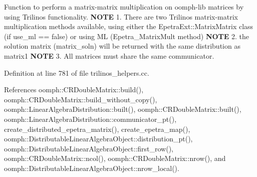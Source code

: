 Function to perform a matrix-\/matrix multiplication on oomph-\/lib matrices by using Trilinos functionality. {\bfseries N\+O\+TE} 1. There are two Trilinos matrix-\/matrix multiplication methods available, using either the Epetra\+Ext\+::\+Matrix\+Matrix class (if use\+\_\+ml == false) or using ML (Epetra\+\_\+\+Matrix\+Mult method) {\bfseries N\+O\+TE} 2. the solution matrix (matrix\+\_\+soln) will be returned with the same distribution as matrix1 {\bfseries N\+O\+TE} 3. All matrices must share the same communicator. 



Definition at line 781 of file trilinos\+\_\+helpers.\+cc.



References oomph\+::\+C\+R\+Double\+Matrix\+::build(), oomph\+::\+C\+R\+Double\+Matrix\+::build\+\_\+without\+\_\+copy(), oomph\+::\+Linear\+Algebra\+Distribution\+::built(), oomph\+::\+C\+R\+Double\+Matrix\+::built(), oomph\+::\+Linear\+Algebra\+Distribution\+::communicator\+\_\+pt(), create\+\_\+distributed\+\_\+epetra\+\_\+matrix(), create\+\_\+epetra\+\_\+map(), oomph\+::\+Distributable\+Linear\+Algebra\+Object\+::distribution\+\_\+pt(), oomph\+::\+Distributable\+Linear\+Algebra\+Object\+::first\+\_\+row(), oomph\+::\+C\+R\+Double\+Matrix\+::ncol(), oomph\+::\+C\+R\+Double\+Matrix\+::nrow(), and oomph\+::\+Distributable\+Linear\+Algebra\+Object\+::nrow\+\_\+local().

